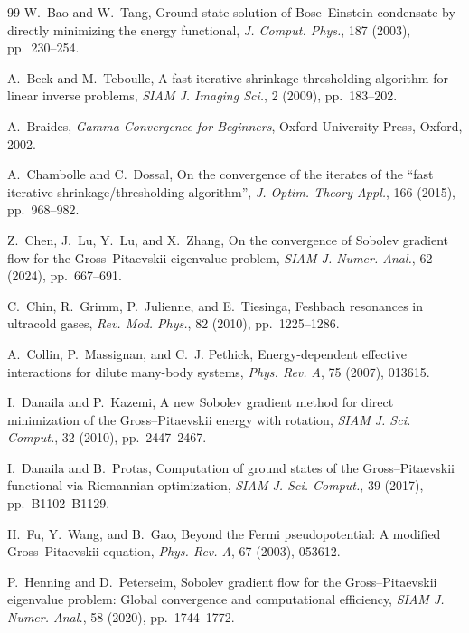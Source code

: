 \documentclass[11pt]{article}
\theoremstyle{plain}
\theoremstyle{definition}
\numberwithin{equation}{section}
\begin{document}
\begin{thebibliography}{99}
W.~Bao and W.~Tang,
\newblock Ground-state solution of Bose--Einstein condensate by
directly minimizing the energy functional,
\newblock \emph{J. Comput. Phys.}, 187 (2003), pp.~230--254.

A.~Beck and M.~Teboulle,
\newblock A fast iterative shrinkage-thresholding algorithm for linear inverse problems,
\newblock \emph{SIAM J. Imaging Sci.}, 2 (2009), pp.~183--202.

A.~Braides,
\newblock \emph{Gamma-Convergence for Beginners},
\newblock Oxford University Press, Oxford, 2002.

A.~Chambolle and C.~Dossal,
\newblock On the convergence of the iterates of the ``fast iterative
shrinkage/thresholding algorithm'',
\newblock \emph{J. Optim. Theory Appl.}, 166 (2015), pp.~968--982.

Z.~Chen, J.~Lu, Y.~Lu, and X.~Zhang,
\newblock On the convergence of Sobolev gradient flow for the
Gross--Pitaevskii eigenvalue problem,
\newblock \emph{SIAM J. Numer. Anal.}, 62 (2024), pp.~667--691.

C.~Chin, R.~Grimm, P.~Julienne, and E.~Tiesinga,
\newblock Feshbach resonances in ultracold gases,
\newblock \emph{Rev. Mod. Phys.}, 82 (2010), pp.~1225--1286.

A.~Collin, P.~Massignan, and C.~J. Pethick,
\newblock Energy-dependent effective interactions for dilute
many-body systems,
\newblock \emph{Phys. Rev. A}, 75 (2007), 013615.

I.~Danaila and P.~Kazemi,
\newblock A new Sobolev gradient method for direct minimization of the
Gross--Pitaevskii energy with rotation,
\newblock \emph{SIAM J. Sci. Comput.}, 32 (2010), pp.~2447--2467.

I.~Danaila and B.~Protas,
\newblock Computation of ground states of the Gross--Pitaevskii
functional via Riemannian optimization,
\newblock \emph{SIAM J. Sci. Comput.}, 39 (2017), pp.~B1102--B1129.

H.~Fu, Y.~Wang, and B.~Gao,
\newblock Beyond the Fermi pseudopotential: A modified
Gross--Pitaevskii equation,
\newblock \emph{Phys. Rev. A}, 67 (2003), 053612.

P.~Henning and D.~Peterseim,
\newblock Sobolev gradient flow for the Gross--Pitaevskii eigenvalue
problem: Global convergence and computational efficiency,
\newblock \emph{SIAM J. Numer. Anal.}, 58 (2020), pp.~1744--1772.


\end{thebibliography}
\end{document}
